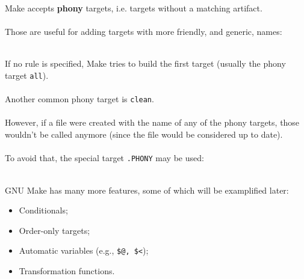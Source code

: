 
\begin{frame}{\secname}
    Make accepts \textbf{phony} targets, i.e. targets without a matching artifact. \\~\\

    Those are useful for adding targets with more friendly, and generic, names: \\~\\

    \makeTarget

\end{frame}


\begin{frame}{\secname}
    If no rule is specified, Make tries to build the first target (usually the phony target \texttt{all}). \\~\\

    Another common phony target is \texttt{clean}. \\~\\

    However, if a file were created with the name of any of the phony targets, those wouldn't be called anymore (since the file would be considered up to date). \\~\\

    To avoid that, the special target \texttt{.PHONY} may be used: \\~\\

    \makePhony

\end{frame}

\begin{frame}{\secname}
    GNU Make has many more features, some of which will be examplified later:

    \begin{itemize}
        \item Conditionals;
        \item Order-only targets;
        \item Automatic variables (e.g., \texttt{\$@, \$<});
        \item Transformation functions.
    \end{itemize}
\end{frame}
